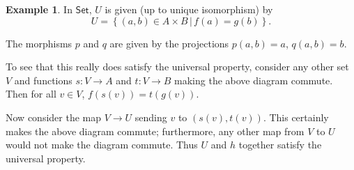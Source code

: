 \documentclass[a4paper]{report}
\theoremstyle{definition}
\newtheorem{example}{Example}[section]
\theoremstyle{plain}
\theoremstyle{remark}
\begin{document}
\begin{example}
  In $\mathsf{Set}$, $U$ is given (up to unique isomorphism) by 
  \begin{equation*}
    U = \left\{ (a,b) \in A \times B \,\big|\, f(a) = g(b) \right\}.
  \end{equation*}

  The morphisms $p$ and $q$ are given by the projections $p(a,b) = a$, $q(a,b) = b$.

  To see that this really does satisfy the universal property, consider any other set $V$ and functions $s\colon V \to A$ and $t\colon V \to B$ making the above diagram commute. Then for all $v \in V$, $f(s(v)) = t(g(v))$.

  Now consider the map $V \to U$ sending $v$ to $(s(v), t(v))$. This certainly makes the above diagram commute; furthermore, any other map from $V$ to $U$ would not make the diagram commute. Thus $U$ and $h$ together satisfy the universal property.
\end{example}
\end{document}
